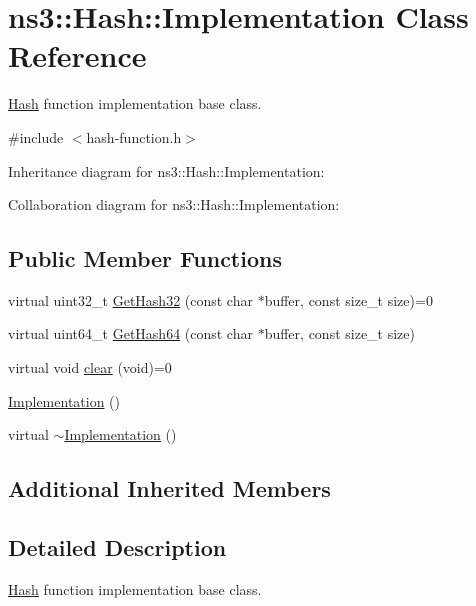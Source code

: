 \hypertarget{classns3_1_1Hash_1_1Implementation}{}\section{ns3\+:\+:Hash\+:\+:Implementation Class Reference}
\label{classns3_1_1Hash_1_1Implementation}


\hyperlink{namespacens3_1_1Hash}{Hash} function implementation base class.  




{\ttfamily \#include $<$hash-\/function.\+h$>$}



Inheritance diagram for ns3\+:\+:Hash\+:\+:Implementation\+:


Collaboration diagram for ns3\+:\+:Hash\+:\+:Implementation\+:
\subsection*{Public Member Functions}
\begin{DoxyCompactItemize}
\item 
virtual uint32\+\_\+t \hyperlink{classns3_1_1Hash_1_1Implementation_a8389694c8a89ec15f4f356ef52fe8891}{Get\+Hash32} (const char $\ast$buffer, const size\+\_\+t size)=0
\item 
virtual uint64\+\_\+t \hyperlink{classns3_1_1Hash_1_1Implementation_ae11335959394d22427d81abfa520106a}{Get\+Hash64} (const char $\ast$buffer, const size\+\_\+t size)
\item 
virtual void \hyperlink{classns3_1_1Hash_1_1Implementation_a5d4e565e4292e8ada991ccc1e28bb3d1}{clear} (void)=0
\item 
\hyperlink{classns3_1_1Hash_1_1Implementation_a39cded5bf434cc6b14a1fb685826d1fd}{Implementation} ()
\item 
virtual \hyperlink{classns3_1_1Hash_1_1Implementation_ab73c594f5c1a3a2c47117ce2ab08a90a}{$\sim$\+Implementation} ()
\end{DoxyCompactItemize}
\subsection*{Additional Inherited Members}


\subsection{Detailed Description}
\hyperlink{namespacens3_1_1Hash}{Hash} function implementation base class. 

